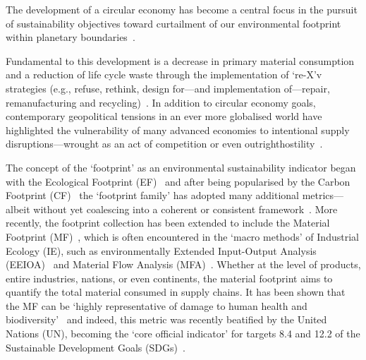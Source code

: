 \documentclass[a4paper,fleqn]{cas-dc}
\begin{document}
The development of a circular economy has become a central focus in the pursuit of sustainability objectives toward curtailment of our environmental footprint within planetary boundaries~\citep{eu2019greendeal,eu2020circ,nl2023ceplan,nl2016ceplan,pardo2018ce,ellenmacarthur2015ce}.

Fundamental to this development is a decrease in primary material consumption and a reduction of life cycle waste through the implementation of `re-X'v strategies (e.g., refuse, rethink, design for---and implementation of---repair, remanufacturing and recycling)~\citep{reike2018rex, eu2022ecodesign, eu2022repair, eu2015reman}. In addition to circular economy goals, contemporary geopolitical tensions in an ever more globalised world have highlighted the vulnerability of many advanced economies to intentional supply disruptions---wrought as an act of competition or even outrighthostility~\citep{jrc2023supplychain,hartley2024cepolitics,berry2023crm}.

The concept of the `footprint' as an environmental sustainability indicator began with the Ecological Footprint (EF)~\citep{wackernagel1994ecologicalfootprint} and after being popularised by the Carbon Footprint (CF)~\citep{cucek2015environmentalfootprints} the `footprint family' has adopted many additional metrics---albeit without yet
coalescing into a coherent or consistent framework~\citep{giampietro2014footprintstonowhere,vanham2019footprints,ridoutt2013footprints}. More recently, the footprint
collection has been extended to include the Material Footprint (MF)~\citep{weidmann2013materialfootprint}, which is often encountered in the
`macro methods' of Industrial Ecology (IE), such as environmentally Extended Input-Output Analysis (EEIOA)~\citep{lenzen2022materialfootprint} and Material
Flow Analysis (MFA)~\citep{schaffartzik2013mfafootprint}. Whether at the level of products, entire industries, nations, or even continents, the material
footprint aims to quantify the total material consumed in supply chains. It has been shown that the MF can be `highly representative of damage to human health
and biodiversity'~\citep{steinmann2017resourcefootprints} and indeed, this metric was recently beatified by the United Nations (UN), becoming the `core
official indicator' for targets 8.4 and 12.2 of the Sustainable Development Goals (SDGs)~\citep{lenzen2022materialfootprint}.
\end{document}
